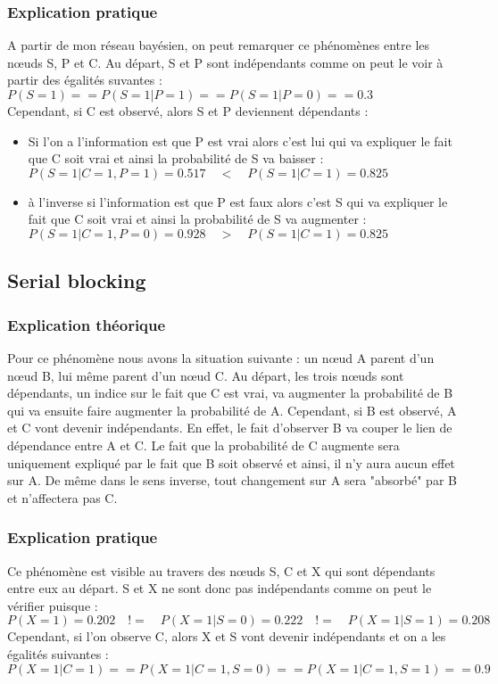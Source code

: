 \documentclass[12pt]{article}
\begin{document}
\subsubsection{Explication pratique}
A partir de mon réseau bayésien, on peut remarquer ce phénomènes entre les nœuds S, P et C. Au départ, S et P sont indépendants comme on peut le voir à partir des égalités suvantes :
$P(S=1) == P(S=1|P=1) == P(S=1|P=0) == 0.3$
\\
Cependant, si C est observé, alors S et P deviennent dépendants :
\begin{itemize}
\item Si l'on a l'information est que P est vrai alors c'est lui qui va expliquer le fait que C soit vrai et ainsi la probabilité de S va baisser :
\\ $P(S=1|C=1,P=1) = 0.517 \quad < \quad P(S=1|C=1) = 0.825$ \\
\item à l'inverse si l'information est que P est faux alors c'est S qui va expliquer le fait que C soit vrai et ainsi la probabilité de S va augmenter :
\\ $P(S=1|C=1,P=0) = 0.928 \quad > \quad P(S=1|C=1) = 0.825$ \\
\end{itemize}

\subsection{Serial blocking}
\subsubsection{Explication théorique}
Pour ce phénomène nous avons la situation suivante : un nœud A parent d'un nœud B, lui même parent d'un nœud C. Au départ, les trois nœuds sont dépendants, un indice sur le fait que C est vrai, va augmenter la probabilité de B qui va ensuite faire augmenter la probabilité de A. Cependant, si B est observé, A et C vont devenir indépendants. En effet, le fait d'observer B va couper le lien de dépendance entre A et C. Le fait que la probabilité de C augmente sera uniquement expliqué par le fait que B soit observé et ainsi, il n'y aura aucun effet sur A. De même dans le sens inverse, tout changement sur A sera "absorbé" par B et n'affectera pas C.
\subsubsection{Explication pratique}
Ce phénomène est visible au travers des nœuds S, C et X qui sont dépendants entre eux au départ. S et X ne sont donc pas indépendants comme on peut le vérifier puisque : $P(X=1)=0.202 \quad != \quad P(X=1|S=0)=0.222\quad !=\quad P(X=1|S=1)=0.208$ \\
Cependant, si l'on observe C, alors X et S vont devenir indépendants et on a les égalités suivantes : \\
$P(X=1|C=1) == P(X=1|C=1,S=0) == P(X=1|C=1,S=1) == 0.9$
\end{document}
